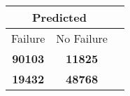 \begin{tabular} 
 {@{}ccc@{}} 
\toprule 
\multicolumn{2}{c}{\textbf{Predicted}}
 \\ \midrule 
\multicolumn{1}{|c|}{Failure} & 
\multicolumn{1}{c|}{No Failure}
 \\ \midrule 
\multicolumn{1}{|c|}{\color{green}\textbf{90103}} & 
\multicolumn{1}{c|}{\color{red}\textbf{11825}}
 \\ \midrule 
\multicolumn{1}{|c|}{\color{red}\textbf{19432}} & 
\multicolumn{1}{c|}{\color{green}\textbf{48768}}
 \\ \bottomrule 
\end{tabular} 

